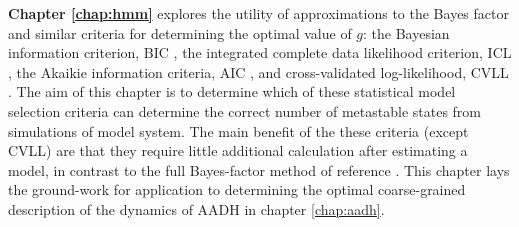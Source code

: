 \textbf{Chapter \ref{chap:hmm}} explores the utility of approximations to the Bayes factor and similar criteria for determining the optimal value of $g$: the Bayesian information criterion, BIC \cite{schwarzEstimatingDimensionModel1978a}, the integrated complete data likelihood criterion, ICL \cite{biernackiAssessingMixtureModel2000a}, the Akaikie information criteria, AIC \cite{akaikeInformationTheoryExtension1998}, and cross-validated log-likelihood, CVLL \cite{celeuxSelectingHiddenMarkov2008}. The aim of this chapter is to determine which of these statistical model selection criteria can determine the correct number of metastable states from simulations of  model system. The main benefit of the these criteria (except CVLL) are that they require little additional calculation after estimating a model, in contrast to the full Bayes-factor method of reference \cite{bacalladoBayesianComparisonMarkov2009a}.  This chapter lays the ground-work for application to determining the optimal coarse-grained description of the dynamics of AADH in chapter \ref{chap:aadh}. 

